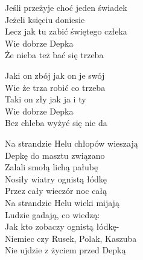 \begin{text}
    \vin Jeśli przeżyje choć jeden świadek\\
    \vin Jeżeli księciu doniesie\\
    \vin Lecz jak tu zabić świętego człeka\\
    \vin Wie dobrze Depka\\
    \vin Że nieba też bać się trzeba

    \vin Jaki on zbój jak on je swój\\
    \vin Wie że trza robić co trzeba\\
    \vin Taki on zły jak ja i ty\\
    \vin Wie dobrze Depka\\
    \vin Bez chleba wyżyć się nie da

    Na strandzie Helu chłopów wieszają\\
    Depkę do masztu związano\\
    Zalali smołą lichą pałubę\\
    Nosiły wiatry ognistą łódkę\\
    Przez cały wieczór noc całą\\
    \vin Na strandzie Helu wieki mijają\\
    \vin Ludzie gadają, co wiedzą:\\
    \vin Jak kto zobaczy ognistą łódkę-\\
    \vin Niemiec czy Rusek, Polak, Kaszuba\\
    \vin Nie ujdzie z życiem przed Depką
\end{text}
\begin{chord}

\end{chord}